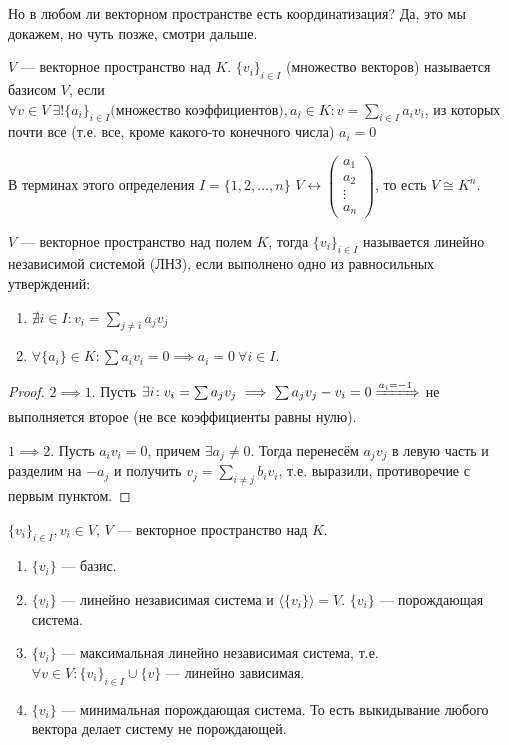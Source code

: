 Но в любом ли векторном пространстве есть координатизация? Да, это мы докажем, но чуть позже, смотри дальше.
\begin{definition}
	$V$ --- векторное пространство над  $K$.  $\{ v_i \}_{i \in I}$ (множество векторов) называется базисом  $V$, если  $\forall v \in V\ \exists! \{a_i\}_{i \in I}\text{(множество коэффициентов)}, a_i \in K\!: v = \sum_{i \in I} a_i v_i$, из которых почти все (т.е. все, кроме какого-то конечного числа) $a_i = 0$
\end{definition}
\begin{remark}
    В терминах этого определения $I = \{1, 2, \ldots, n\}$ $V \leftrightarrow \begin{pmatrix} a_1 \\ a_2 \\ \vdots \\ a_n \end{pmatrix}$, то есть $V \cong K^n$.
\end{remark}
\begin{definition}
    $V$ --- векторное пространство над полем  $K$, тогда  $\{v_i\}_{i \in I}$ называется линейно независимой системой (ЛНЗ), если выполнено одно из равносильных утверждений:
     \begin{enumerate}
         \item $\nexists i \in I\!: v_i = \sum\limits_{j \neq i} a_jv_j$ 
         \item $\forall \{a_i\} \in K\!: \sum a_i v_i = 0 \implies a_i = 0\ \forall i \in I$.
    \end{enumerate}
\end{definition}
\begin{proof}
	$2 \implies 1$.  Пусть  $\exists i\!: v_i = \sum a_j v_j \implies \sum a_j v_j - v_i = 0 \xRightarrow{a_i = -1}$ не выполняется второе (не все коэффициенты равны нулю).

    $1 \implies 2$. Пусть  $a_i v_i = 0$, причем  $\exists a_j \neq 0$. Тогда перенесём $a_j v_j$ в левую часть и разделим на $-a_j$ и получить  $v_j = \sum\limits_{i \neq j} b_i v_i$, т.е. выразили, противоречие с первым пунктом.
\end{proof}
\begin{theorem}
    $\{v_i\}_{i \in I}, v_i \in V$,  $V$ --- векторное пространство над $K$.
     \begin{enumerate} 
         \item $\{v_i\}$ --- базис.
         \item $\{v_i\}$ --- линейно независимая система и  $\langle \{v_i\} \rangle = V$.  $\{v_i\}$ --- порождающая система.
	 \item  $\{v_i\}$ --- максимальная линейно независимая система, т.е. $\forall v \in V\!: \{v_i\}_{i \in I} \cup \{v\}$ --- линейно зависимая.
         \item  $\{v_i\}$ --- минимальная порождающая система. То есть выкидывание любого вектора делает систему не порождающей.
    \end{enumerate}
\end{theorem}
